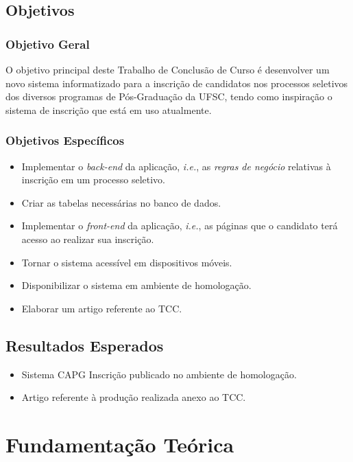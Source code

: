 \documentclass[
  10.5pt,				  %
	openright,			%
	twoside,			  %
  a5paper,
  chapter=TITLE,	%
	section=TITLE,	%
  hyphens,        %
	english,        %
	brazil          %
]{abntex2}
\begin{document}
\section{Objetivos}

\subsection{Objetivo Geral}
O objetivo principal deste Trabalho de Conclusão de Curso é desenvolver um novo sistema informatizado para a inscrição de candidatos nos processos seletivos dos diversos programas de Pós-Graduação da UFSC, tendo como inspiração o sistema de inscrição que está em uso atualmente.

\subsection{Objetivos Específicos}
\begin{itemize}
  \item Implementar o \emph{back-end} da aplicação, \emph{i.e.}, as \emph{regras de negócio} relativas à inscrição em um processo seletivo.
  \item Criar as tabelas necessárias no banco de dados.
  \item Implementar o \emph{front-end} da aplicação, \emph{i.e.}, as páginas que o candidato terá acesso ao realizar sua inscrição.
  \item Tornar o sistema acessível em dispositivos móveis.
  \item Disponibilizar o sistema em ambiente de homologação.
  \item Elaborar um artigo referente ao TCC.
\end{itemize}

\section{Resultados Esperados}
\begin{itemize}
  \item Sistema CAPG Inscrição publicado no ambiente de homologação.
  \item Artigo referente à produção realizada anexo ao TCC.
\end{itemize}



\chapter{Fundamentação Teórica}
\end{document}
